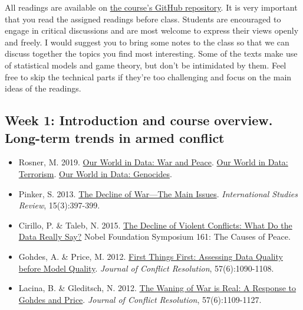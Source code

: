 \documentclass[12pt,]{article}
\providecommand{\tightlist}{%
  \setlength{\itemsep}{0pt}\setlength{\parskip}{0pt}}
\begin{document}
All readings are available on
\href{https://github.com/danilofreire/political-violence-syllabus-2019}{the
course's GitHub repository}. It is very important that you read the
assigned readings before class. Students are encouraged to engage in
critical discussions and are most welcome to express their views openly
and freely. I would suggest you to bring some notes to the class so that
we can discuss together the topics you find most interesting. Some of
the texts make use of statistical models and game theory, but don't be
intimidated by them. Feel free to skip the technical parts if they're
too challenging and focus on the main ideas of the readings.

\hypertarget{week-1-introduction-and-course-overview.-long-term-trends-in-armed-conflict}{%
\subsection{Week 1: Introduction and course overview. Long-term trends
in armed
conflict}\label{week-1-introduction-and-course-overview.-long-term-trends-in-armed-conflict}}

\begin{itemize}
\tightlist
\item
  Rosner, M. 2019. \href{https://ourworldindata.org/war-and-peace}{Our
  World in Data: War and Peace}.
  \href{https://ourworldindata.org/terrorism}{Our World in Data:
  Terrorism}. \href{https://ourworldindata.org/genocides}{Our World in
  Data: Genocides}.
\item
  Pinker, S. 2013.
  \href{http://sci-hub.tw/https://academic.oup.com/isr/article-abstract/15/3/396/1851344?redirectedFrom=fulltext}{The
  Decline of War---The Main Issues}. \emph{International Studies
  Review}, 15(3):397-399.
\item
  Cirillo, P. \& Taleb, N. 2015.
  \href{https://www.fooledbyrandomness.com/pinker.pdf}{The Decline of
  Violent Conflicts: What Do the Data Really Say?} Nobel Foundation
  Symposium 161: The Causes of Peace.
\item
  Gohdes, A. \& Price, M. 2012.
  \href{http://journals.sagepub.com/doi/10.1177/0022002712459708}{First
  Things First: Assessing Data Quality before Model Quality}.
  \emph{Journal of Conflict Resolution}, 57(6):1090-1108.
\item
  Lacina, B. \& Gleditsch, N. 2012.
  \href{http://journals.sagepub.com/doi/abs/10.1177/0022002712459709}{The
  Waning of War is Real: A Response to Gohdes and Price}. \emph{Journal
  of Conflict Resolution}, 57(6):1109-1127.
\end{itemize}
\end{document}
